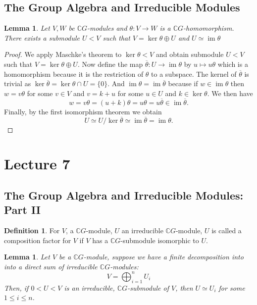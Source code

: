 \documentclass[11pt, notitlepage]{article}
\numberwithin{equation}{section}
\theoremstyle{plain}
\newtheorem{lemma}[theorem]{Lemma}
\theoremstyle{definition}
\newtheorem{definition}[theorem]{Definition}
\newcommand{\CG}{{\mathbb{C}G}}
\DeclareMathOperator{\im}{im}
\begin{document}
\subsection{The Group Algebra and Irreducible Modules}


\begin{lemma}\label{Lem:FIT}
Let $V,W$ be $\mathbb{C}G$-modules and $\theta : V \to W$ is a $\mathbb{C}G$-homomorphism. There exists a submodule $U < V$ such that $V = \ker\theta \oplus U$ and $U \simeq \im\theta$
\end{lemma}
\begin{proof}
We apply Maschke's theorem to $\ker\theta < V$ and obtain submodule $U < V$ such that $V = \ker\theta \oplus U$. Now define the map $\overline\theta : U \to \im\theta$ by $u\mapsto u\theta$ which is a homomorphism because it is the restriction of $\theta$ to a subspace. The kernel of $\overline\theta$ is trivial as $\ker\overline\theta = \ker\theta\cap U = \{0\}$. And $\im\theta = \im\overline\theta$ because if $w\in\im\theta$ then $w=v\theta$ for some $v\in V$ and $v=k + u$ for some $u\in U$ and $k\in\ker\theta$. We then have
\[
	w = v\theta = (u+k)\theta = u\theta = u\overline\theta \in \im\overline\theta.
\]
Finally, by the first isomorphism theorem we obtain
\[
	U \simeq U/\ker\overline\theta \simeq \im\overline\theta = \im\theta.
\]
\end{proof}






\section{Lecture 7}

\subsection{The Group Algebra and Irreducible Modules: Part II}


\begin{definition}
	For $V$, a $\CG$-module, $U$ an irreducible $\CG$-module, $U$ is called a composition factor for $V$ if $V$ has a $\CG$-submodule isomorphic to $U$.
\end{definition}

\begin{lemma}\label{Lem:decomp}
	Let $V$ be a $\CG$-module, suppose we have a finite decomposition into into a direct sum of irreducible $\CG$-modules:
	\[
	V = \bigoplus_{i=1}^n U_i
	\]
	Then, if $0<U<V$ is an irreducible, $\CG$-submodule of $V$, then $U\simeq U_i$ for some $1\leq i\leq n$.
\end{lemma}
\end{document}
